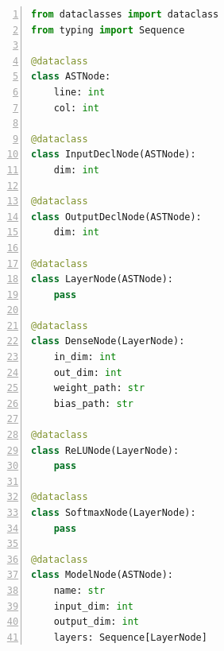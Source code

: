 \documentclass[11pt,a4paper]{article}
\begin{document}
\begin{lstlisting}[language=Python, caption={Abstract Syntax Tree Node Hierarchy (\texttt{tmlc/ast/nodes.py})}, label={lst:ast_nodes_py}, basicstyle=\ttfamily\scriptsize, frame=single, numbers=left]
from dataclasses import dataclass
from typing import Sequence

@dataclass
class ASTNode:
    line: int
    col: int

@dataclass
class InputDeclNode(ASTNode):
    dim: int

@dataclass
class OutputDeclNode(ASTNode):
    dim: int

@dataclass
class LayerNode(ASTNode):
    pass

@dataclass
class DenseNode(LayerNode):
    in_dim: int
    out_dim: int
    weight_path: str
    bias_path: str

@dataclass
class ReLUNode(LayerNode):
    pass

@dataclass
class SoftmaxNode(LayerNode):
    pass

@dataclass
class ModelNode(ASTNode):
    name: str
    input_dim: int
    output_dim: int
    layers: Sequence[LayerNode]
\end{lstlisting}
\end{document}
